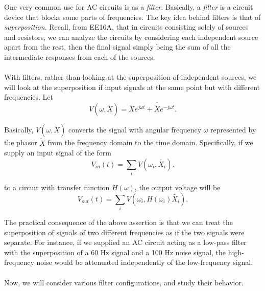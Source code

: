 
One very common use for AC circuits is as a \emph{filter}.
Basically, a \emph{filter} is a circuit device that blocks some parts of frequencies.
The key idea behind filters is that of \emph{superposition}.
Recall, from EE16A, that in circuits consisting solely of sources and resistors, we can analyze the circuits by considering each independent source apart from the rest, then the final signal simply being the sum of all the intermediate responses from each of the sources.
\\
\\
With filters, rather than looking at the superposition of independent sources, we will look at the superposition if input signals at the same point but with different frequencies.
Let
\[
  V(\omega, \widetilde{X}) = \widetilde{X}e^{j \omega t} + \overline{\widetilde{X}}e^{-j \omega t}
.\]

Basically, $V(\omega, \widetilde{X})$ converts the signal with angular frequency $\omega$ represented by the phasor $\widetilde{X}$ from the frequency domain to the time domain.
Specifically, if we supply an input signal of the form
\[
  V_{in}(t) = \sum_i V(\omega_i, \widetilde{X_i})
.\]

to a circuit with transfer function $H(\omega)$, the output voltage will be
\[
  V_{out}(t) = \sum_i V(\omega_i, H(\omega_i)\widetilde{X_i})
.\]

The practical consequence of the above assertion is that we can treat the superposition of signals of two different frequencies as if the two signals were separate.
For instance, if we supplied an AC circuit acting as a low-pass filter with the superposition of a 60 Hz signal and a 100 Hz noise signal, the high-frequency noise would be attenuated independently of the low-frequency signal.
\\
\\
Now, we will consider various filter configurations, and study their behavior.



